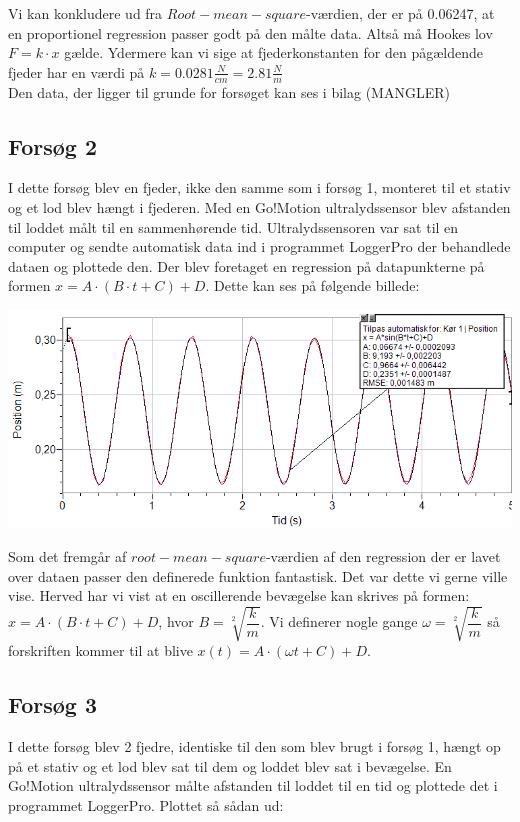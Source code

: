 Vi kan konkludere ud fra $Root-mean-square$-værdien, der er på 0.06247, at en proportionel regression passer godt på den målte data. Altså må Hookes lov $F=k \cdot x$ gælde. Ydermere kan vi sige at fjederkonstanten for den pågældende fjeder har en værdi på $k=0.0281\frac{N}{cm} = 2.81 \frac{N}{m}$
\\

Den data, der ligger til grunde for forsøget kan ses i bilag (MANGLER) 
\\

\subsection{Forsøg 2}
I dette forsøg blev en fjeder, ikke den samme som i forsøg 1, monteret til et stativ og et lod blev hængt i fjederen. Med en Go!Motion ultralydssensor blev afstanden til loddet målt til en sammenhørende tid. Ultralydssensoren var sat til en computer og sendte automatisk data ind i programmet LoggerPro der behandlede dataen og plottede den. Der blev foretaget en regression på datapunkterne på formen $x = A \cdot (B \cdot t + C) + D$. Dette kan ses på følgende billede: 
\begin{center}
\includegraphics[scale=0.7]{Billeder/graf2}
\end{center}

Som det fremgår af $root-mean-square$-værdien af den regression der er lavet over dataen passer den definerede funktion fantastisk. Det var dette vi gerne ville vise. Herved har vi vist at en oscillerende bevægelse kan skrives på formen: $x = A \cdot (B \cdot t + C) + D$, hvor $B=\sqrt[2]{\dfrac{k}{m}}$. Vi definerer nogle gange $\omega = \sqrt[2]{\dfrac{k}{m}}$ så forskriften kommer til at blive $x(t) = A \cdot (\omega t + C) + D$.

\subsection{Forsøg 3}
I dette forsøg blev 2 fjedre, identiske til den som blev brugt i forsøg 1, hængt op på et stativ og et lod blev sat til dem og loddet blev sat i bevægelse. En Go!Motion ultralydssensor målte afstanden til loddet til en tid og plottede det i programmet LoggerPro. Plottet så sådan ud:

